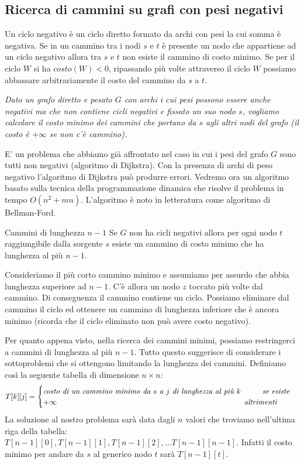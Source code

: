 \subsection{Ricerca di cammini su grafi con pesi negativi}
Un ciclo negativo è un ciclo diretto formato da archi con pesi la cui somma è negativa. Se in un cammino tra i nodi $s$ e $t$ è presente un nodo che appartiene ad un ciclo negativo allora tra $s$ e $t$ non esiste il cammino di costo minimo. Se per il ciclo $W$ si ha $costo(W) <0$, ripassando più volte attraverso il ciclo $W$ possiamo abbassare arbitrariamente il costo del cammino da $s$ a $t$. 

\textit{Dato un grafo diretto e pesato $G$ con archi i cui pesi possono essere anche negativi ma che non contiene cicli negativi e fissato un suo nodo $s$, vogliamo calcolare il costo minimo dei cammini che portano da $s$ agli altri nodi del grafo (il costo è $+\infty$ se non c'è cammino).}

E' un problema che abbiamo già affrontato nel caso in cui i pesi del grafo $G$ sono tutti non negativi (algoritmo di Dijkstra). Con la presenza di archi di peso negativo l'algoritmo di Dijkstra può produrre errori. Vedremo ora un algoritmo basato sulla tecnica della programmazione dinamica che risolve il problema in tempo $O(n^2+mn)$. L'algoritmo è noto in letteratura come algoritmo di Bellman-Ford.

\begin{Lemma}{Cammini di lunghezza $n-1$}{}
    Se $G$ non ha cicli negativi allora per ogni nodo $t$ raggiungibile dalla sorgente $s$ esiste un cammino di costo minimo che ha lunghezza al più $n-1$.
    \begin{demonstration}
        Consideriamo il più corto cammino minimo e assumiamo per assurdo che abbia lunghezza superiore ad $n-1$. C'è allora un nodo $z$ toccato più volte dal cammino. Di conseguenza il cammino contiene un ciclo. Possiamo eliminare dal cammino il ciclo ed ottenere un cammino di lunghezza inferiore che è ancora minimo (ricorda che il ciclo eliminato non può avere costo negativo).
    \end{demonstration}
\end{Lemma}

Per quanto appena visto, nella ricerca dei cammini minimi, possiamo restringerci a cammini di lunghezza al più $n-1$. Tutto questo suggerisce di considerare i sottoproblemi che si ottengono limitando la lunghezza dei cammini. Definiamo così la seguente tabella di dimensione $n\times n$:
\begin{equation*}T[k][j]=
\begin{cases}
    \textit{costo di un cammino minimo da }s\textit{ a }j\textit{ di lunghezza al più }k\hspace{1cm}\textit{se esiste}\\
    +\infty\hspace{8.7cm}\textit{altrimenti}
\end{cases}
\end{equation*}
La soluzione al nostro problema sarà data dagli $n$ valori che troviamo nell'ultima riga della tabella: $T[n-1][0], T[n-1][1], T[n-1][2], ... T[n-1][n-1]$. Infatti il costo minimo per andare da $s$ al generico nodo $t$ sarà $T[n-1][t]$.

